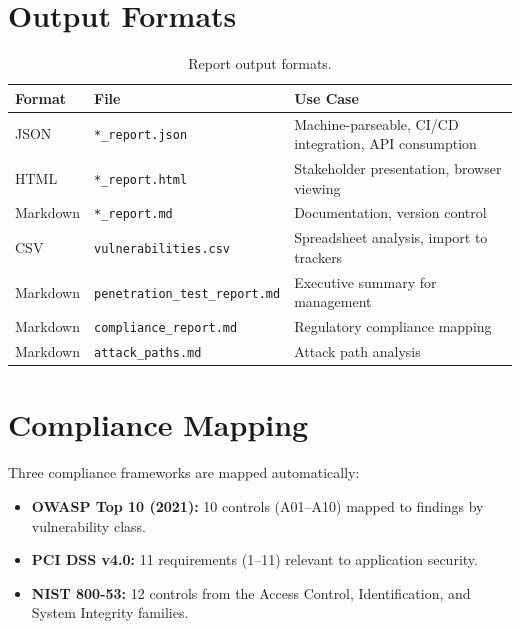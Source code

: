 \documentclass[12pt,a4paper,twoside]{report}
\begin{document}
\section{Output Formats}

\begin{table}[H]
\centering
\caption{Report output formats.}
\label{tab:formats}
\begin{tabularx}{\textwidth}{llX}
\toprule
\textbf{Format} & \textbf{File} & \textbf{Use Case} \\
\midrule
JSON     & \texttt{*\_report.json}           & Machine-parseable, CI/CD integration, API consumption \\
HTML     & \texttt{*\_report.html}           & Stakeholder presentation, browser viewing \\
Markdown & \texttt{*\_report.md}             & Documentation, version control \\
CSV      & \texttt{vulnerabilities.csv}       & Spreadsheet analysis, import to trackers \\
Markdown & \texttt{penetration\_test\_report.md} & Executive summary for management \\
Markdown & \texttt{compliance\_report.md}     & Regulatory compliance mapping \\
Markdown & \texttt{attack\_paths.md}          & Attack path analysis \\
\bottomrule
\end{tabularx}
\end{table}

\section{Compliance Mapping}

Three compliance frameworks are mapped automatically:

\begin{itemize}
    \item \textbf{OWASP Top 10 (2021):} 10 controls (A01--A10) mapped to findings by vulnerability class.
    \item \textbf{PCI DSS v4.0:} 11 requirements (1--11) relevant to application security.
    \item \textbf{NIST 800-53:} 12 controls from the Access Control, Identification, and System Integrity families.
\end{itemize}


\end{document}
